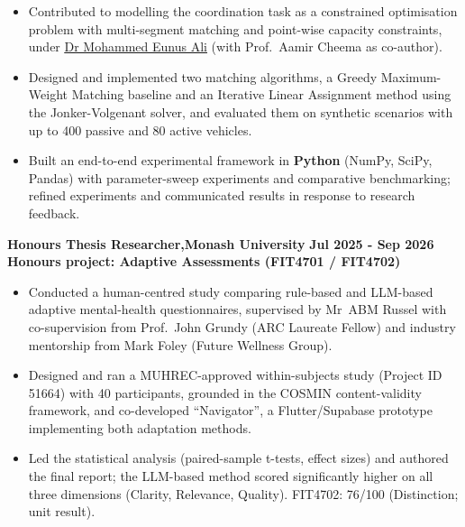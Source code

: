 \documentclass[11pt, a4paper]{article}
\let\hrefnoul\href
\renewcommand{\href}[2]{\hrefnoul{#1}{\ul{#2}}}
\begin{document}
\begin{itemize}[leftmargin=1.5em, itemsep=2pt, topsep=1pt, parsep=0pt]
  \item Contributed to modelling the coordination task as a constrained optimisation problem
        with multi-segment matching and point-wise capacity constraints, under
        \href{https://research.monash.edu/en/persons/eunus-ali}{Dr Mohammed Eunus Ali}
        (with Prof.~Aamir Cheema as co-author).

  \item Designed and implemented two matching algorithms, a Greedy Maximum-Weight Matching
        baseline and an Iterative Linear Assignment method using the Jonker-Volgenant solver,
        and evaluated them on synthetic scenarios with up to 400 passive and 80 active vehicles.

  \item Built an end-to-end experimental framework in \textbf{Python} (NumPy, SciPy, Pandas)
        with parameter-sweep experiments and comparative benchmarking; refined experiments
        and communicated results in response to research feedback.
\end{itemize}

\vspace{3pt}
\noindent\textbf{Honours Thesis Researcher,\quad Monash University}%
\hfill\textbf{Jul 2025 - Sep 2026}\\
\textbf{Honours project: Adaptive Assessments (FIT4701 / FIT4702)}

\begin{itemize}[leftmargin=1.5em, itemsep=2pt, topsep=1pt, parsep=0pt]
  \item Conducted a human-centred study comparing rule-based and LLM-based adaptive mental-health
        questionnaires, supervised by Mr~ABM Russel with co-supervision from Prof.~John Grundy
        (ARC Laureate Fellow) and industry mentorship from Mark Foley (Future Wellness Group).

  \item Designed and ran a MUHREC-approved within-subjects study (Project ID 51664) with 40
        participants, grounded in the COSMIN content-validity framework, and co-developed
        ``Navigator'', a Flutter/Supabase prototype implementing both adaptation methods.

  \item Led the statistical analysis (paired-sample t-tests, effect sizes) and authored the final
        report; the LLM-based method scored significantly higher on all three dimensions
        (Clarity, Relevance, Quality). FIT4702: 76/100 (Distinction; unit result).
\end{itemize}
\end{document}
